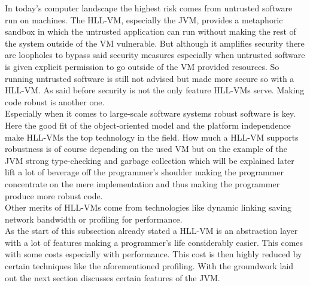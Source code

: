 In today's computer landscape the highest risk comes from untrusted software run on machines. The HLL-VM, especially the JVM,  provides a metaphoric sandbox in which the untrusted application can run without making the rest of the system outside of the VM vulnerable. But although it amplifies security there are loopholes to bypass said security measures especially when untrusted software is given explicit permission to go outside of the VM provided resources. So running untrusted software is still not advised but made more secure so with a HLL-VM. As said before security is not the only feature HLL-VMs serve. Making code robust is another one.\\
Especially when it comes to large-scale software systems robust software is key. Here the good fit of the object-oriented model and the platform independence make HLL-VMs the top technology in the field. How much a HLL-VM supports robustness is of course depending on the used VM but on the example of the JVM strong type-checking and garbage collection which will be explained later lift a lot of beverage off the programmer's shoulder making the programmer concentrate on the mere implementation and thus making the programmer produce more robust code.\\
Other merits of HLL-VMs come from technologies like dynamic linking saving network bandwidth or profiling for performance.\cite{Smith}\\
As the start of this subsection already stated a HLL-VM is an abstraction layer with a lot of features making a programmer's life considerably easier. This comes with some costs especially with performance. This cost is then highly reduced by certain techniques like the aforementioned profiling. With the groundwork laid out the next section discusses certain features of the JVM.

